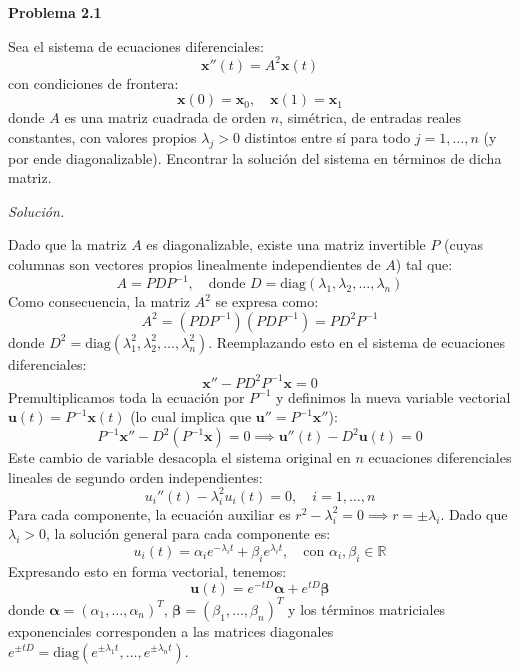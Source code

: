 \documentclass[12pt,letterpaper]{article}
\begin{document}
\textbf{Problema 2.1}

\medskip
Sea el sistema de ecuaciones diferenciales:
\begin{equation}
  \mathbf{x}''(t) = A^2 \mathbf{x}(t)
\end{equation}
con condiciones de frontera:
\[
  \mathbf{x}(0) = \mathbf{x}_0, \quad \mathbf{x}(1) = \mathbf{x}_1
\]
donde $A$ es una matriz cuadrada de orden $n$, simétrica, de entradas reales constantes, con valores propios $\lambda_j > 0$ distintos entre sí para todo $j = 1, \dots, n$ (y por ende diagonalizable). Encontrar la solución del sistema en términos de dicha matriz.

\medskip
\textit{Solución.}

Dado que la matriz $A$ es diagonalizable, existe una matriz invertible $P$ (cuyas columnas son vectores propios linealmente independientes de $A$) tal que:
\[
  A = P D P^{-1}, \quad \text{donde } D = \text{diag}(\lambda_1, \lambda_2, \dots, \lambda_n)
\]
Como consecuencia, la matriz $A^2$ se expresa como:
\[
  A^2 = (P D P^{-1})(P D P^{-1}) = P D^2 P^{-1}
\]
donde $D^2 = \text{diag}(\lambda_1^2, \lambda_2^2, \dots, \lambda_n^2)$. Reemplazando esto en el sistema de ecuaciones diferenciales:
\[
  \mathbf{x}'' - P D^2 P^{-1} \mathbf{x} = 0
\]
Premultiplicamos toda la ecuación por $P^{-1}$ y definimos la nueva variable vectorial $\mathbf{u}(t) = P^{-1} \mathbf{x}(t)$ (lo cual implica que $\mathbf{u}'' = P^{-1} \mathbf{x}''$):
\[
  P^{-1} \mathbf{x}'' - D^2 (P^{-1} \mathbf{x}) = 0 \implies \mathbf{u}''(t) - D^2 \mathbf{u}(t) = 0
\]
Este cambio de variable desacopla el sistema original en $n$ ecuaciones diferenciales lineales de segundo orden independientes:
\[
  u_i''(t) - \lambda_i^2 u_i(t) = 0, \quad i = 1, \dots, n
\]
Para cada componente, la ecuación auxiliar es $r^2 - \lambda_i^2 = 0 \implies r = \pm \lambda_i$. Dado que $\lambda_i > 0$, la solución general para cada componente es:
\[
  u_i(t) = \alpha_i e^{-\lambda_i t} + \beta_i e^{\lambda_i t}, \quad \text{con } \alpha_i, \beta_i \in \mathbb{R}
\]
Expresando esto en forma vectorial, tenemos:
\[
  \mathbf{u}(t) = e^{-tD} \boldsymbol{\alpha} + e^{tD} \boldsymbol{\beta}
\]
donde $\boldsymbol{\alpha} = (\alpha_1, \dots, \alpha_n)^T$, $\boldsymbol{\beta} = (\beta_1, \dots, \beta_n)^T$ y los términos matriciales exponenciales corresponden a las matrices diagonales $e^{\pm tD} = \text{diag}(e^{\pm \lambda_1 t}, \dots, e^{\pm \lambda_n t})$.
\end{document}
